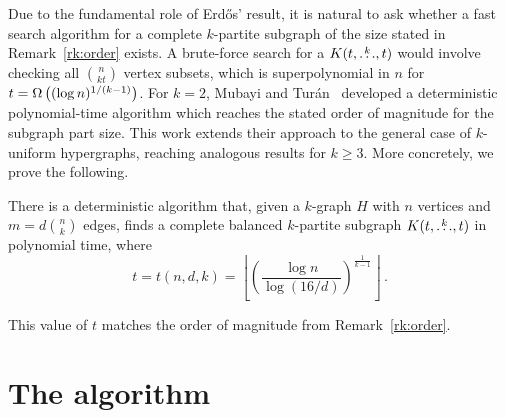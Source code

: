Due to the fundamental role of Erd\H{o}s' result,
it is natural to ask whether a fast search algorithm for a complete $k$-partite subgraph of the size stated in Remark~\ref{rk:order} exists.
A brute-force search for a $K(t, \overset{k}{\dots}, t)$ would involve checking all $\binom{n}{kt}$ vertex subsets, which is superpolynomial in $n$ for ${t = \Omega\left((\log n)^{1/(k-1)}\right)}$.
For $k=2$, Mubayi and Tur\'{a}n~\cite{MUBAYI2010174} developed a deterministic polynomial-time algorithm which reaches the stated order of magnitude for the subgraph part size.
This work extends their approach to the general case of $k$-uniform hypergraphs, reaching analogous results for $k \ge 3$.
More concretely, we prove the following.

\begin{theorem} \label{thm:main_theorem}
There is a deterministic algorithm that, given a $k$-graph $H$ with $n$ vertices and $m=d \binom{n}{k}$ edges, finds a complete balanced $k$-partite subgraph $K(t, \overset{k}{\dots}, t)$ in polynomial time, where
\[
    t = t(n, d, k) = \left\lfloor \left( \frac{\log n}{\log (16/d)}  \right)^{\frac{1}{k-1}} \right \rfloor \,.
\]
\end{theorem}
This value of $t$ matches the order of magnitude from Remark~\ref{rk:order}.

\section{The algorithm}\label{sec:finding-a-balanced-$k$-partite-subgraph}

